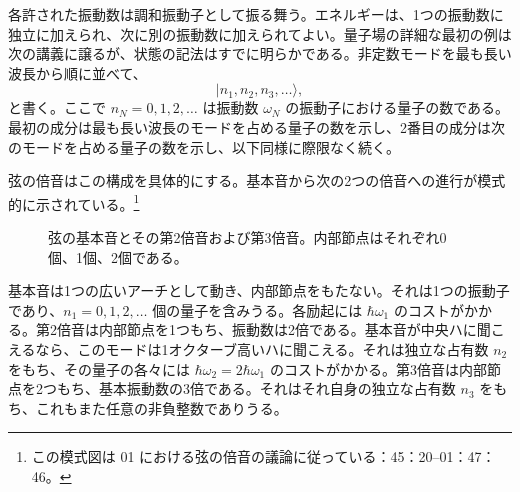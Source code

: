 各許された振動数は調和振動子として振る舞う。エネルギーは、1つの振動数に独立に加えられ、次に別の振動数に加えられてよい。量子場の詳細な最初の例は次の講義に譲るが、状態の記法はすでに明らかである。非定数モードを最も長い波長から順に並べて、
\begin{equation}
|n_1,n_2,n_3,\ldots\rangle,
\end{equation}
と書く。ここで \(n_N=0,1,2,\ldots\) は振動数 \(\omega_N\) の振動子における量子の数である。最初の成分は最も長い波長のモードを占める量子の数を示し、2番目の成分は次のモードを占める量子の数を示し、以下同様に際限なく続く。

弦の倍音はこの構成を具体的にする。基本音から次の2つの倍音への進行が模式的に示されている。\footnote{この模式図は 01 における弦の倍音の議論に従っている：45：20--01：47：46。}

\begin{figure}[t]
\centering
{}
\caption{弦の基本音とその第2倍音および第3倍音。内部節点はそれぞれ0個、1個、2個である。}
\end{figure}

基本音は1つの広いアーチとして動き、内部節点をもたない。それは1つの振動子であり、\(n_1=0,1,2,\ldots\) 個の量子を含みうる。各励起には \(\hbar\omega_1\) のコストがかかる。第2倍音は内部節点を1つもち、振動数は2倍である。基本音が中央ハに聞こえるなら、このモードは1オクターブ高いハに聞こえる。それは独立な占有数 \(n_2\) をもち、その量子の各々には \(\hbar\omega_2=2\hbar\omega_1\) のコストがかかる。第3倍音は内部節点を2つもち、基本振動数の3倍である。それはそれ自身の独立な占有数 \(n_3\) をもち、これもまた任意の非負整数でありうる。

